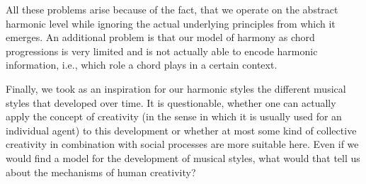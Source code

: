All these problems arise because of the fact, that we operate on the abstract harmonic level while ignoring the actual underlying principles from which it emerges.
An additional problem is that our model of harmony as chord progressions is very limited and is not actually able to encode harmonic information, i.e., which role a chord plays in a certain context.

Finally, we took as an inspiration for our harmonic styles the different musical styles that developed over time.
It is questionable, whether one can actually apply the concept of creativity (in the sense in which it is usually used for an individual agent) to this development or whether at most some kind of collective creativity in combination with social processes are more suitable here.
Even if we would find a model for the development of musical styles, what would that tell us about the mechanisms of human creativity?